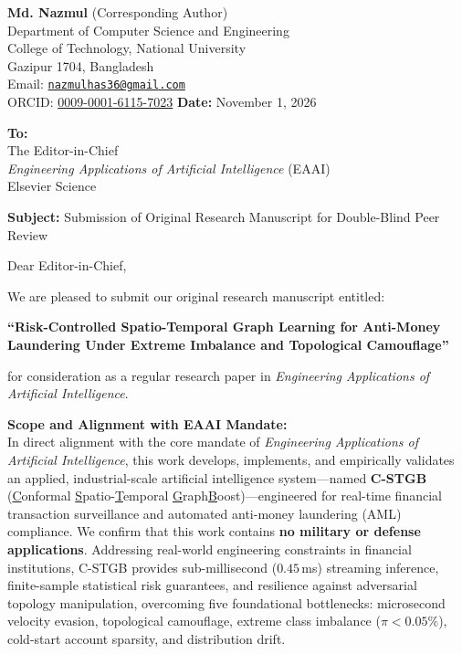 \documentclass[11pt,a4paper]{article}
\begin{document}
\pagestyle{empty}

\noindent
\textbf{Md. Nazmul} (Corresponding Author) \\
Department of Computer Science and Engineering \\
College of Technology, National University \\
Gazipur 1704, Bangladesh \\
Email: \href{mailto:nazmulhas36@gmail.com}{\texttt{nazmulhas36@gmail.com}} \\
ORCID: \href{https://orcid.org/0009-0001-6115-7023}{0009-0001-6115-7023} \hfill \textbf{Date:} November 1, 2026

\vspace{1.2em}
\noindent
\textbf{To:} \\
The Editor-in-Chief \\
\textit{Engineering Applications of Artificial Intelligence} (EAAI) \\
Elsevier Science

\vspace{1.2em}
\noindent
\textbf{Subject:} Submission of Original Research Manuscript for Double-Blind Peer Review

\vspace{0.8em}
\noindent
Dear Editor-in-Chief,

\vspace{0.6em}
\noindent
We are pleased to submit our original research manuscript entitled:

\begin{center}
\textbf{``Risk-Controlled Spatio-Temporal Graph Learning for Anti-Money Laundering Under Extreme Imbalance and Topological Camouflage''}
\end{center}

\noindent
for consideration as a regular research paper in \textit{Engineering Applications of Artificial Intelligence}.

\vspace{0.6em}
\noindent
\textbf{Scope and Alignment with EAAI Mandate:}\\
In direct alignment with the core mandate of \textit{Engineering Applications of Artificial Intelligence}, this work develops, implements, and empirically validates an applied, industrial-scale artificial intelligence system---named \textbf{C-STGB} (\underline{C}onformal \underline{S}patio-\underline{T}emporal \underline{G}raph\underline{B}oost)---engineered for real-time financial transaction surveillance and automated anti-money laundering (AML) compliance. We confirm that this work contains \textbf{no military or defense applications}. Addressing real-world engineering constraints in financial institutions, C-STGB provides sub-millisecond ($0.45$\,ms) streaming inference, finite-sample statistical risk guarantees, and resilience against adversarial topology manipulation, overcoming five foundational bottlenecks: microsecond velocity evasion, topological camouflage, extreme class imbalance ($\pi < 0.05\%$), cold-start account sparsity, and distribution drift.
\end{document}
